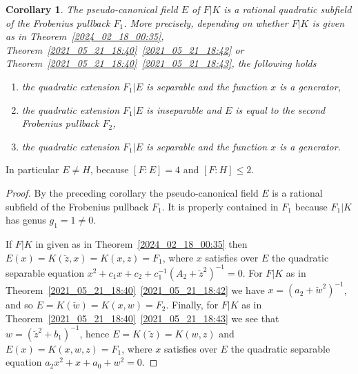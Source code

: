 \documentclass[12pt,reqno]{amsart}
\newtheorem{cor}[thm]{Corollary}
\theoremstyle{definition}
\newcommand{\su}{\subset}
\begin{document}



\begin{cor}\label{2024_08_25_19:45}
The pseudo-canonical field $E$ of $F|K$ is a rational quadratic subfield of the Frobenius pullback $F_1$.
More precisely, depending on whether $F|K$ is given as in Theorem~\ref{2024_02_18_00:35}, Theorem~\ref{2021_05_21_18:40}~\ref{2021_05_21_18:42} or Theorem~\ref{2021_05_21_18:40}~\ref{2021_05_21_18:43}, the following holds
\begin{enumerate}[\upshape (a)]
    \item the quadratic extension $F_1|E$ is separable and the function $x$ is a generator,
    \item the quadratic extension $F_1|E$ is inseparable and $E$ is equal to the second Frobenius pullback $F_2$,
    \item the quadratic extension $F_1|E$ is separable and the function $x$ is a generator.
\end{enumerate}
\end{cor}

In particular $E\neq H$, because $[F:E]=4$ and $[F:H] \leq 2$.

\begin{proof}
By the preceding corollary the pseudo-canonical field $E$ is a rational subfield of the Frobenius pullback $F_1$.
It is properly contained in $F_1$ because $F_1|K$ has genus $g_1=1\neq 0$.

If $F|K$ in given as in Theorem~\ref{2024_02_18_00:35} then $E(x) = K(\breve z,x) =  K(x,z)=F_1$, where $x$ satisfies over $E$ the quadratic separable equation $x^2 + c_1 x + c_2 + c_1^{-1}(A_2 + \breve z^2)^{-1} = 0$.
For $F|K$ as in Theorem~\ref{2021_05_21_18:40}~\ref{2021_05_21_18:42} we have $x = (a_2 + \breve w^2)^{-1}$, and so $E=K(\breve w) = K(x,w) = F_2$.
Finally, for $F|K$ as in Theorem~\ref{2021_05_21_18:40}~\ref{2021_05_21_18:43} we see that 
$ w = (\breve z^2 + b_1)^{-1}$, hence $E=K(\breve z) = K(w,z)$ and $E(x) = K(x,w,z) = F_1$, where $x$ satisfies over $E$ the quadratic separable equation $a_2 x^2 + x + a_0 + w^2 = 0$.
\end{proof}
\end{document}
